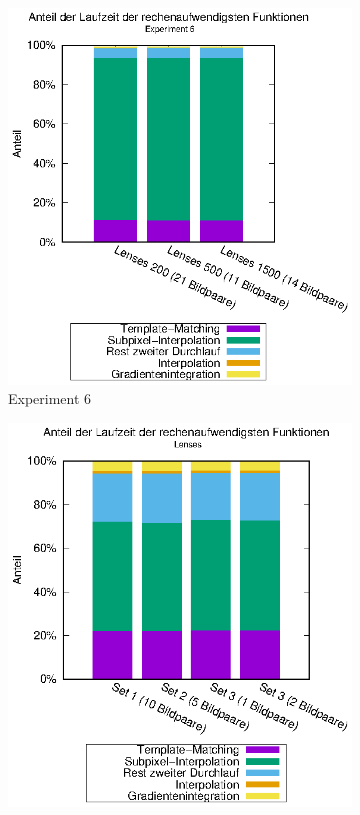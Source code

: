 \begin{center}
	\begin{figure}[htbp]
		\begin{subfigure}[b]{0.5\textwidth}
			\centering
			\includegraphics[width=\textwidth]{pdf/slow_exp6}
			\caption{Experiment 6}
			\label{fig:perc_slow_exp6}
		\end{subfigure}
		\begin{subfigure}[b]{0.5\textwidth}
			\centering
			\includegraphics[width=\textwidth]{pdf/slow_lenses}

\end{subfigure}
\end{figure}
\end{center}
